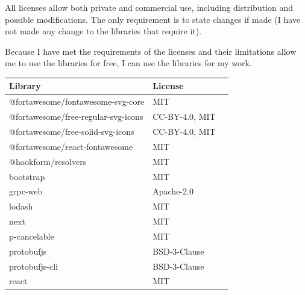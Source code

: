 All licenses allow both private and commercial use, including distribution and possible modifications.
The only requirement is to
state changes if made (I have not made any change to the libraries that require it).


Because I have met the requirements of the licenses and their limitations allow me to use the libraries for free, I can use the libraries for my work.

\newcommand{\library}[1]{%
    #1\tablefootnote{\url{https://www.npmjs.com/package/#1}}%
}

\newpage
\begin{table}[hbt!]
    \centering
    \captionsetup{justification=centering}
    \begin{tabular}{|l|l|l|}
        \hline
        \textbf{Library}                              & \textbf{License} \\ \hline
        \library{@fortawesome/fontawesome-svg-core}   & MIT              \\ \hline
        \library{@fortawesome/free-regular-svg-icons} & CC-BY-4.0, MIT   \\ \hline
        \library{@fortawesome/free-solid-svg-icons}   & CC-BY-4.0, MIT   \\ \hline
        \library{@fortawesome/react-fontawesome}      & MIT              \\ \hline
        \library{@hookform/resolvers}                 & MIT              \\ \hline
        \library{bootstrap}                           & MIT              \\ \hline
        \library{grpc-web}                            & Apache-2.0       \\ \hline
        \library{lodash}                              & MIT              \\ \hline
        \library{next}                                & MIT              \\ \hline
        \library{p-cancelable}                        & MIT              \\ \hline
        \library{protobufjs}                          & BSD-3-Clause     \\ \hline
        \library{protobufjs-cli}                      & BSD-3-Clause     \\ \hline
        \library{react}                               & MIT              \\ \hline

\end{tabular}
\end{table}
